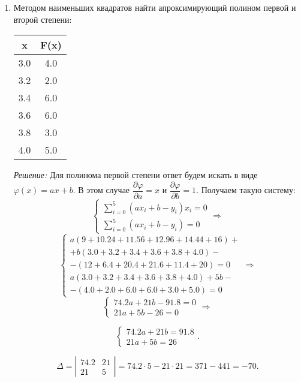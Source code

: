 \documentclass[a4paper, 12pt]{article}
\begin{document}
\begin{enumerate}
\item{Методом наименьших квадратов найти апроксимирующий полином первой и второй степени:
    
    \begin{tabular}{|c|c|}
      \hline
      x & F(x) \\ \hline
      3.0 & 4.0 \\ \hline
      3.2 & 2.0 \\ \hline
      3.4 & 6.0 \\ \hline
      3.6 & 6.0 \\ \hline
      3.8 & 3.0 \\ \hline
      4.0 & 5.0 \\
      \hline
    \end{tabular}

    \emph{Решение:} Для полинома первой степени ответ будем искать в виде $\varphi (x) = ax + b$. В этом случае $\dfrac {\partial \varphi} {\partial a} = x$ и $\dfrac {\partial \varphi} {\partial b} = 1$. Получаем такую систему:
    $$
    \begin{cases}
      \sum \limits_{i = 0}^5 (ax_i+b - y_i)x_i = 0 \\
      \sum \limits_{i = 0}^5 (ax_i + b - y_i) = 0
    \end{cases}
    \Rightarrow
    $$
    $$
    \begin{cases}
      a(9+10.24+11.56+12.96+14.44+16) + \\ + b(3.0 + 3.2 + 3.4 + 3.6 + 3.8 + 4.0) - \\ -(12 + 6.4 + 20.4 + 21.6 + 11.4 + 20) = 0 \\
      a(3.0 + 3.2 + 3.4 + 3.6 + 3.8 + 4.0) + 5b - \\ -(4.0 + 2.0 + 6.0 + 6.0 + 3.0 + 5.0) = 0
    \end{cases}
    \Rightarrow
    $$
    $$
    \begin{cases}
      74.2a + 21b - 91.8 = 0 \\
      21a + 5b - 26 = 0
    \end{cases}
    \Rightarrow
    $$

    $$
    \begin{cases}
      74.2a + 21b = 91.8 \\
      21a + 5b = 26
    \end{cases}
    .
    $$

    $$
    \Delta =
    \left |
      \begin{array}{cc}
        74.2 & 21 \\
        21 & 5
      \end{array}
    \right |
    = 74.2 \cdot 5 - 21 \cdot 21 = 371 - 441 = -70.
    $$


}
\end{enumerate}
\end{document}
